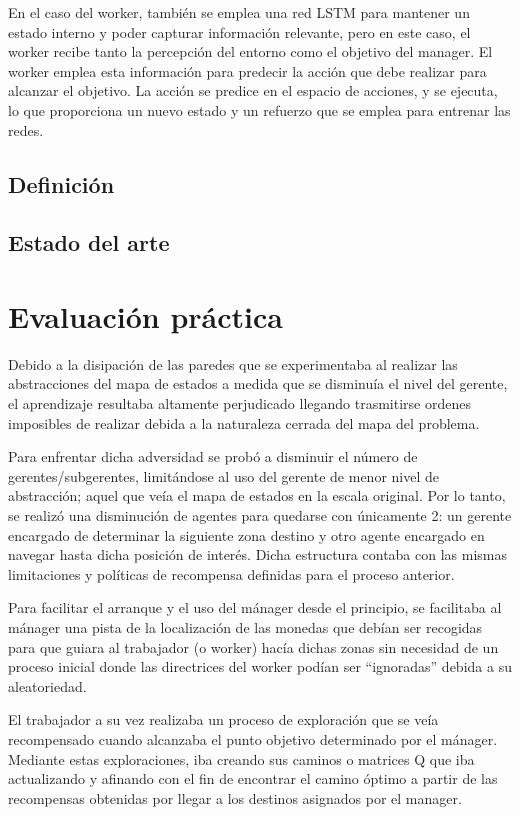 \documentclass[letterpaper]{article} %
\begin{document}
En el caso del worker, también se emplea una red LSTM para mantener un estado interno y poder capturar información relevante,
pero en este caso, el worker recibe tanto la percepción del entorno como el objetivo del manager. El worker emplea esta información
para predecir la acción que debe realizar para alcanzar el objetivo. La acción se predice en el espacio de acciones, y se ejecuta,
lo que proporciona un nuevo estado y un refuerzo que se emplea para entrenar las redes.




\subsection{Definición}

\subsection{Estado del arte}

\section{Evaluación práctica}


Debido a la disipación de las paredes que se experimentaba al realizar las abstracciones del mapa de estados a medida que se disminuía el nivel del gerente, el aprendizaje resultaba altamente perjudicado llegando trasmitirse ordenes imposibles de realizar debida a la naturaleza cerrada del mapa del problema.

Para enfrentar dicha adversidad se probó a disminuir el número de gerentes/subgerentes, limitándose al uso del gerente de menor nivel de abstracción; aquel que veía el mapa de estados en la escala original. Por lo tanto, se realizó una disminución de agentes para quedarse con únicamente 2: un gerente encargado de determinar la siguiente zona destino y otro agente encargado en navegar hasta dicha posición de interés. Dicha estructura contaba con las mismas limitaciones y políticas de recompensa definidas para el proceso anterior.


Para facilitar el arranque y el uso del mánager desde el principio, se facilitaba al mánager una pista de la localización de las monedas que debían ser recogidas para que guiara al trabajador (o worker) hacía dichas zonas sin necesidad de un proceso inicial donde las directrices del worker podían ser “ignoradas” debida a su aleatoriedad. 

El trabajador a su vez realizaba un proceso de exploración que se veía recompensado cuando alcanzaba el punto objetivo determinado por el mánager. Mediante estas exploraciones, iba creando sus caminos o matrices Q que iba actualizando y afinando con el fin de encontrar el camino óptimo a partir de las recompensas obtenidas por llegar a los destinos asignados por el manager.
\end{document}
